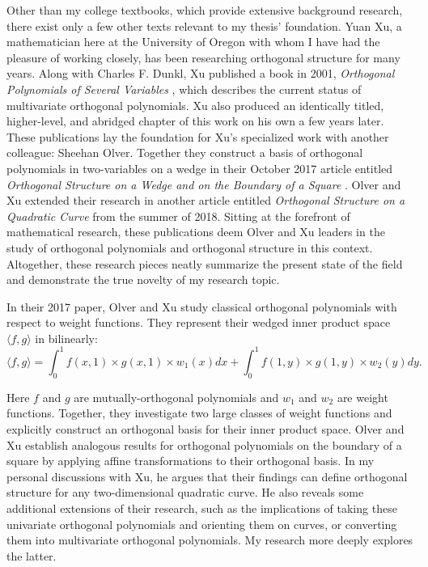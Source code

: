 \documentclass[letterpaper, 12pt]{article}
\begin{document}
Other than my college textbooks, which provide extensive background research, there exist only a few other texts relevant to my thesis' foundation. Yuan Xu, a mathematician here at the University of Oregon with whom I have had the pleasure of working closely, has been researching orthogonal structure for many years. Along with Charles F. Dunkl, Xu published a book in 2001, \textit{Orthogonal Polynomials of Several Variables} \cite{dxu}, which describes the current status of multivariate orthogonal polynomials. Xu also produced an identically titled, higher-level, and abridged chapter of this work \cite{yxu} on his own a few years later. These publications lay the foundation for Xu's specialized work with another colleague: Sheehan Olver. Together they construct a basis of orthogonal polynomials in two-variables on a wedge in their October 2017 article entitled \textit{Orthogonal Structure on a Wedge and on the Boundary of a Square} \cite{oxu1}. Olver and Xu extended their research in another article entitled \textit{Orthogonal Structure on a Quadratic Curve} \cite{oxu2} from the summer of 2018. Sitting at the forefront of mathematical research, these publications deem Olver and Xu leaders in the study of orthogonal polynomials and orthogonal structure in this context. Altogether, these research pieces neatly summarize the present state of the field and demonstrate the true novelty of my research topic.

In their 2017 paper, Olver and Xu study classical orthogonal polynomials with respect to weight functions. They represent their wedged inner product space $\langle f, g\rangle$ in bilinearly: $$\langle f, g\rangle = \int_0^1 f(x,1)\times g(x,1)\times w_1(x) dx +  \int_0^1 f(1,y)\times g(1,y)\times w_2(y) dy.$$

\noindent Here $f$ and $g$ are mutually-orthogonal polynomials and $w_1$ and $w_2$ are weight functions. Together, they investigate two large classes of weight functions and explicitly construct an orthogonal basis for their inner product space. Olver and Xu establish analogous results for orthogonal polynomials on the boundary of a square by applying affine transformations to their orthogonal basis. In my personal discussions with Xu, he argues that their findings can define orthogonal structure for any two-dimensional quadratic curve. He also reveals some additional extensions of their research, such as the implications of taking these univariate orthogonal polynomials and orienting them on curves, or converting them into multivariate orthogonal polynomials. My research more deeply explores the latter.
\end{document}
